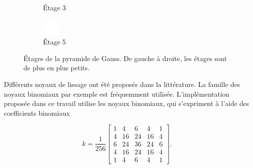 \begin{figure}
\begin{subfigure}{.3\textwidth}
        \caption{Étage 3}
    \end{subfigure}
    \hfill
    \begin{subfigure}{.3\textwidth}
        \centering
        \includegraphics[width=\textwidth]{contenu/resources/images/gauss_5}
        \caption{Étage 5}
    \end{subfigure}

    \caption[Étages de la pyramide de Gauss]{Étages de la pyramide de Gauss. De gauche à droite, les étages sont de plus en plus petits.}
    \label{fig:gaussian-pyramid}
\end{figure}

Différents noyaux de lissage ont été proposés dans la littérature. La famille des noyaux binomiaux par exemple est fréquemment utilisée. L'implémentation proposée dans ce travail utilise les noyaux binomiaux, qui s'expriment à l'aide des coefficients binomiaux

\begin{equation}
    k = \frac{1}{256}\left[
        \begin{array}{ccccccc}
            1 & 4 & 6 & 4 & 1 \\
            4 & 16 & 24 & 16 & 4 \\
            6 & 24 & 36 & 24 & 6 \\
            4 & 16 & 24 & 16 & 4 \\
            1 & 4 & 6 & 4 & 1
        \end{array}
    \right].
\end{equation}

